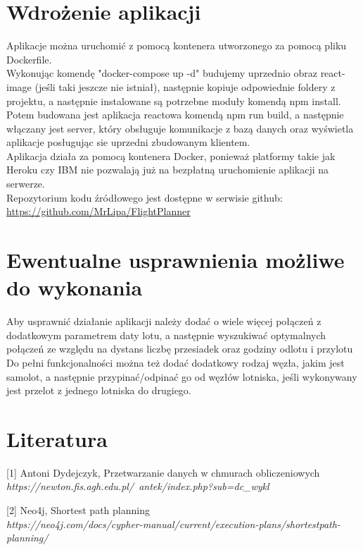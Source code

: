 \documentclass[12pt]{article}
\begin{document}
\section{Wdrożenie aplikacji}
Aplikacje można uruchomić z pomocą kontenera utworzonego za pomocą pliku Dockerfile.\\
Wykonując komendę "docker-compose up -d" budujemy uprzednio obraz react-image (jeśli taki jeszcze nie istniał), następnie
kopiuje odpowiednie foldery z projektu, a następnie instalowane są potrzebne moduły komendą npm install. Potem budowana jest aplikacja reactowa komendą npm run build, a następnie włączany jest server, który obsługuje komunikacje z bazą danych oraz wyświetla aplikacje posługując sie uprzedni zbudowanym klientem.\\
Aplikacja działa za pomocą kontenera Docker, ponieważ platformy takie jak Heroku czy IBM nie pozwalają już na bezpłatną uruchomienie aplikacji na serwerze.\\
Repozytorium kodu źródłowego jest dostępne w serwisie github:\\
\href{https://github.com/MrLipa/FlightPlanner}{https://github.com/MrLipa/FlightPlanner}

\section{Ewentualne usprawnienia możliwe do wykonania}
Aby usprawnić działanie aplikacji należy dodać o wiele więcej połączeń z dodatkowym parametrem daty lotu, a następnie wyszukiwać optymalnych połączeń ze względu na dystans liczbę przesiadek oraz godziny odlotu i przylotu\\
Do pełni funkcjonalności można też dodać dodatkowy rodzaj węzła, jakim jest samolot, a następnie przypinać/odpinać go od węzłów lotniska, jeśli wykonywany jest przelot z jednego lotniska do drugiego.

\section{Literatura}
\begin{description}
\item {[1]} Antoni Dydejczyk, Przetwarzanie danych w chmurach obliczeniowych\\
\textit{https://newton.fis.agh.edu.pl/~antek/index.php?sub=dc\_wykl}
\item {[2]} Neo4j, Shortest path planning\\
\textit{https://neo4j.com/docs/cypher-manual/current/execution-plans/shortestpath-planning/}
\end{description}
\end{document}
